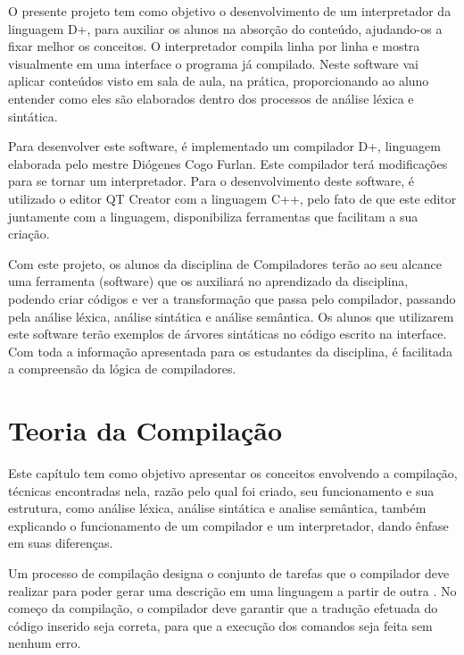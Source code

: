 \documentclass[12pt,oneside,a4paper,chapter=TITLE,section=TITLE,sumario=tradicional]{abntex2}
\begin{document}
O presente projeto tem como objetivo o desenvolvimento de um interpretador da linguagem D+, para auxiliar os alunos na absorção do conteúdo, ajudando-os a fixar melhor os conceitos. O interpretador compila linha por linha e mostra visualmente em uma interface o programa já compilado. Neste software vai aplicar conteúdos visto em sala de aula, na prática, proporcionando ao aluno entender como eles são elaborados dentro dos processos de análise léxica e sintática.

Para desenvolver este software, é implementado um compilador D+, linguagem elaborada pelo mestre Diógenes Cogo Furlan. Este compilador terá modificações para se tornar um interpretador. Para o desenvolvimento deste software, é utilizado o editor QT Creator com a linguagem C++, pelo fato de que este editor juntamente com a linguagem, disponibiliza ferramentas que facilitam a sua criação.

Com este projeto, os alunos da disciplina de Compiladores terão ao seu alcance uma ferramenta (software) que os auxiliará no aprendizado da disciplina, podendo criar códigos e ver a transformação que passa pelo compilador, passando pela análise léxica, análise sintática e análise semântica. Os alunos que utilizarem este software terão exemplos de árvores sintáticas no código escrito na interface. Com toda a informação apresentada para os estudantes da disciplina, é facilitada a compreensão da lógica de compiladores.

\chapter{Teoria da Compilação}
\label{cap:teoria-da-compilação}

Este capítulo tem como objetivo apresentar os conceitos envolvendo a compilação, técnicas encontradas nela, razão pelo qual foi criado, seu funcionamento e sua estrutura, como análise léxica, análise sintática e analise semântica, também explicando o funcionamento de um compilador e um interpretador, dando ênfase em suas diferenças.

Um processo de compilação designa o conjunto de tarefas que o compilador deve realizar para poder gerar uma descrição em uma linguagem a partir de outra \cite{pedro2018}. No começo da compilação, o compilador deve garantir que a tradução efetuada do código inserido seja correta, para que a execução dos comandos seja feita sem nenhum erro.
\end{document}

